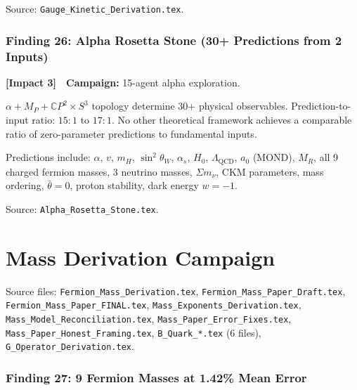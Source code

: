 \documentclass[11pt,a4paper]{article}
\newcommand{\impactthree}{\textcolor{impact3}{\textbf{[Impact 3]}}}
\newcommand{\CP}{\mathbb{C}P}
\begin{document}
Source: \texttt{Gauge\_Kinetic\_Derivation.tex}.


\section{Finding 26: Alpha Rosetta Stone (30+ Predictions from 2 Inputs)}
\label{sec:rosetta}

\impactthree\ \ \textbf{Campaign:} 15-agent alpha exploration.

$\alpha + M_P + \CP^2 \times S^3$ topology determine 30+ physical
observables. Prediction-to-input ratio: $15{:}1$ to $17{:}1$. No other
theoretical framework achieves a comparable ratio of zero-parameter
predictions to fundamental inputs.

Predictions include: $\alpha$, $v$, $m_H$, $\sin^2\theta_W$, $\alpha_s$,
$H_0$, $\Lambda_{\mathrm{QCD}}$, $a_0$ (MOND), $M_R$, all 9 charged
fermion masses, 3 neutrino masses, $\Sigma m_\nu$, CKM parameters, mass
ordering, $\bar\theta = 0$, proton stability, dark energy $w = -1$.

Source: \texttt{Alpha\_Rosetta\_Stone.tex}.


\part{Mass Derivation Campaign}
\label{part:mass}

Source files: \texttt{Fermion\_Mass\_Derivation.tex},
\texttt{Fermion\_Mass\_Paper\_Draft.tex},
\texttt{Fermion\_Mass\_Paper\_FINAL.tex},
\texttt{Mass\_Exponents\_Derivation.tex},
\texttt{Mass\_Model\_Reconciliation.tex},
\texttt{Mass\_Paper\_Error\_Fixes.tex},
\texttt{Mass\_Paper\_Honest\_Framing.tex},
\texttt{B\_Quark\_*.tex} (6 files),
\texttt{G\_Operator\_Derivation.tex}.


\section{Finding 27: 9 Fermion Masses at 1.42\% Mean Error}
\label{sec:9masses}
\end{document}
